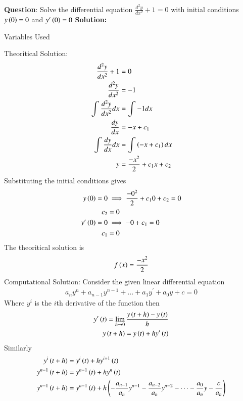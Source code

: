 \documentclass[journal]{IEEEtran}
\begin{document}
\textbf{Question}:\newline
Solve the differential equation $\frac{d^2y}{dx^2} + 1 = 0$ with initial conditions $y\left(0\right) = 0$ and $y^{\prime}\left(0\right) = 0$
\newline
\textbf{Solution: }
\begin{table}[h!]    
  \centering
  
  \caption{Variables Used}
  \label{tab1.1.2.2}
\end{table}
\newline
Theoritical Solution:
\begin{align}
	\frac{d^2y}{dx^2} + 1 &= 0\\
	\frac{d^2y}{dx^2} &= -1\\
	\int_{}^{}\frac{d^2y}{dx^2}dx &= \int_{}^{}-1dx\\
	\frac{dy}{dx} &= -x+c_1\\
	\int_{}^{}\frac{dy}{dx}dx &= \int_{}^{}\left(-x+c_1\right)dx\\
	y &= \frac{-x^2}{2}+{c_1}x+c_2
\end{align}
Substituting the initial conditions gives
\begin{align}
	y\left(0\right) = 0 &\implies \frac{-0^2}{2}+{c_1}0+c_2 = 0\\
	c_2 &= 0\\
	y^{\prime}\left(0\right) = 0 &\implies -0+c_1 = 0\\
	c_1 &= 0
\end{align}
The theoritical solution is 
\begin{align}
	f\left(x\right) = \frac{-x^2}{2}
\end{align}
\newline
Computational Solution:\newline
Consider the given linear differential equation
\begin{align}
	a_{n}y^n + a_{n-1}y^{n-1} + \dots + a_{1}y^\prime + a_{0}y + c = 0
\end{align}
Where $y^{i}$ is the $i$th derivative of the function then
\begin{align}
	y^{\prime}\left(t\right) = \lim_{h\to 0}\frac{y\left(t+h\right) - y\left(t\right)}{h}\\
	y\left(t+h\right) = y\left(t\right) + hy^{\prime}\left(t\right)
\end{align}
Similarly
\begin{align}
	y^{i}\left(t+h\right) &= y^{i}\left(t\right) + hy^{i+1}\left(t\right)\\
	y^{n-1}\left(t+h\right) &= y^{n-1}\left(t\right) + hy^{n}\left(t\right)\\
	y^{n-1}\left(t+h\right) &= y^{n-1}\left(t\right) + h\left(-\frac{a_{n-1}}{a_n}y^{n-1}-\frac{a_{n-2}}{a_n}y^{n-2} - \dots -\frac{a_{0}}{a_n}y - \frac{c}{a_n}\right)
\end{align}
\end{document}
